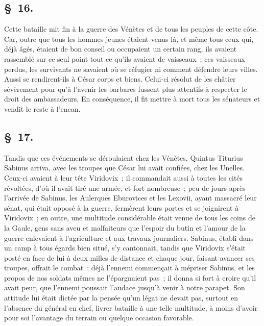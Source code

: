 \documentclass[french,twoside]{book} %
\begin{document}
\subsection[{§ 16.}]{ \textsc{§ 16.} }
\noindent Cette bataille mit fin à la guerre des Vénètes et de tous les peuples de cette côte. Car, outre que tous les hommes jeunes étaient venus là, et même tous ceux qui, déjà âgés, étaient de bon conseil ou occupaient un certain rang, ils avaient rassemblé sur ce seul point tout ce qu’ils avaient de vaisseaux ; ces vaisseaux perdus, les survivants ne savaient où se réfugier ni comment défendre leurs villes. Aussi se rendirent-ils à César corps et biens. Celui-ci résolut de les châtier sévèrement pour qu’à l’avenir les barbares fussent plus attentifs à respecter le droit des ambassadeurs, En conséquence, il fit mettre à mort tous les sénateurs et vendit le reste à l’encan.
\subsection[{§ 17.}]{ \textsc{§ 17.} }
\noindent Tandis que ces événements se déroulaient chez les Vénètes, Quintus Titurius Sabinus arriva, avec les troupes que César lui avait confiées, chez les Unelles. Ceux-ci avaient à leur tête Viridovix ; il commandait aussi à toutes les cités révoltées, d’où il avait tiré une armée, et fort nombreuse ; peu de jours après l’arrivée de Sabinus, les Aulerques Eburovices et les Lexovii, ayant massacré leur sénat, qui était opposé à la guerre, fermèrent leurs portes et se joignirent à Viridovix ; en outre, une multitude considérable était venue de tous les coins de la Gaule, gens sans aveu et malfaiteurs que l’espoir du butin et l’amour de la guerre enlevaient à l’agriculture et aux travaux journaliers. Sabinus, établi dans un camp à tous égards bien situé, s’y cantonnait, tandis que Viridovix s’était posté en face de lui à deux milles de distance et chaque jour, faisant avancer ses troupes, offrait le combat : déjà l’ennemi commençait à mépriser Sabinus, et les propos de nos soldats mêmes ne l’épargnaient pas ; il donna si fort à croire qu’il avait peur, que l’ennemi poussait l’audace jusqu’à venir à notre parapet. Son attitude lui était dictée par la pensée qu’un légat ne devait pas, surtout en l’absence du général en chef, livrer bataille à une telle multitude, à moins d’avoir pour soi l’avantage du terrain ou quelque occasion favorable.
\end{document}
